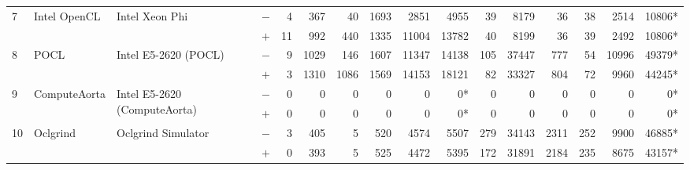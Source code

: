 \begin{tabular}{llll | rrrrrr | rrrrrr }
\hline
\multirow{ 2}{*}{7} & \multirow{ 2}{*}{Intel OpenCL} & \multirow{ 2}{*}{Intel Xeon Phi} & $-$ & 4 & 367 & 40 & 1693 & 2851 & 4955       & 39 & 8179 & 36 & 38 & 2514 & 10806* \\& & & $+$ & 11 & 992 & 440 & 1335 & 11004 & 13782 & 40 & 8199 & 36 & 39 & 2492 & 10806* \\
\hline
\multirow{ 2}{*}{8} & \multirow{ 2}{*}{POCL} & \multirow{ 2}{*}{Intel E5-2620 (POCL)} & $-$ & 9 & 1029 & 146 & 1607 & 11347 & 14138       & 105 & 37447 & 777 & 54 & 10996 & 49379* \\& & & $+$ & 3 & 1310 & 1086 & 1569 & 14153 & 18121 & 82 & 33327 & 804 & 72 & 9960 & 44245* \\
\hline
\multirow{ 2}{*}{9} & \multirow{ 2}{*}{ComputeAorta} & \multirow{ 2}{*}{Intel E5-2620 (ComputeAorta)} & $-$ & 0 & 0 & 0 & 0 & 0 & 0*       & 0 & 0 & 0 & 0 & 0 & 0* \\& & & $+$ & 0 & 0 & 0 & 0 & 0 & 0* & 0 & 0 & 0 & 0 & 0 & 0* \\
\hline
\multirow{ 2}{*}{10} & \multirow{ 2}{*}{Oclgrind} & \multirow{ 2}{*}{Oclgrind Simulator} & $-$ & 3 & 405 & 5 & 520 & 4574 & 5507       & 279 & 34143 & 2311 & 252 & 9900 & 46885* \\& & & $+$ & 0 & 393 & 5 & 525 & 4472 & 5395 & 172 & 31891 & 2184 & 235 & 8675 & 43157* \\
  \bottomrule
\end{tabular}

